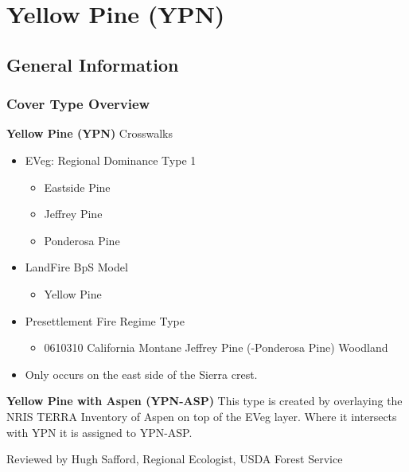 \newpage
\section{Yellow Pine (YPN)}

\subsection*{General Information}

\subsubsection{Cover Type Overview}

\textbf{Yellow Pine (YPN)}
\newline
Crosswalks
\begin{itemize}
	\item EVeg: Regional Dominance Type 1
	\begin{itemize}
		\item Eastside Pine
		\item Jeffrey Pine
		\item Ponderosa Pine
	\end{itemize}

	\item LandFire BpS Model
	\begin{itemize}
		\item Yellow Pine
	\end{itemize}

	\item Presettlement Fire Regime Type
	\begin{itemize}
		\item 0610310 California Montane Jeffrey Pine (-Ponderosa Pine) Woodland
	\end{itemize}

	\item Only occurs on the east side of the Sierra crest.
\end{itemize}

\noindent \textbf{Yellow Pine with Aspen (YPN-ASP)}
\newline
This type is created by overlaying the NRIS TERRA Inventory of Aspen on top of the EVeg layer. Where it intersects with YPN it is assigned to YPN-ASP.

\noindent Reviewed by Hugh Safford, Regional Ecologist, USDA Forest Service

